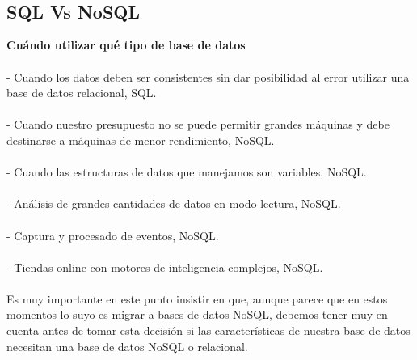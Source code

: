 \documentclass[twoside,twocolumn]{article}
\begin{document}
\begin{flushright}
\begin{itemize}
\textbf{}\\
\textbf{}\\

\subsection{SQL Vs NoSQL }
\textbf{Cuándo utilizar qué tipo de base de datos}\\
\textbf{}\\
-	Cuando los datos deben ser consistentes sin dar posibilidad al error utilizar una base de datos relacional, SQL.\\
\textbf{}\\
-	Cuando nuestro presupuesto no se puede permitir grandes máquinas y debe destinarse a máquinas de menor rendimiento, NoSQL.\\
\textbf{}\\
-	Cuando las estructuras de datos que manejamos son variables, NoSQL.\\
\textbf{}\\
-	Análisis de grandes cantidades de datos en modo lectura, NoSQL.\\
\textbf{}\\
-	Captura y procesado de eventos, NoSQL.\\
\textbf{}\\
-	Tiendas online con motores de inteligencia complejos, NoSQL.\\
\textbf{}\\

Es muy importante en este punto insistir en que, aunque parece que en estos momentos lo suyo es migrar a bases de datos NoSQL, debemos tener muy en cuenta antes de tomar esta decisión si las características de nuestra base de datos necesitan una base de datos NoSQL o relacional.


\textbf{}\\
\textbf{}\\
\textbf{}\\

\end{itemize}
\end{flushright}
\end{document}
